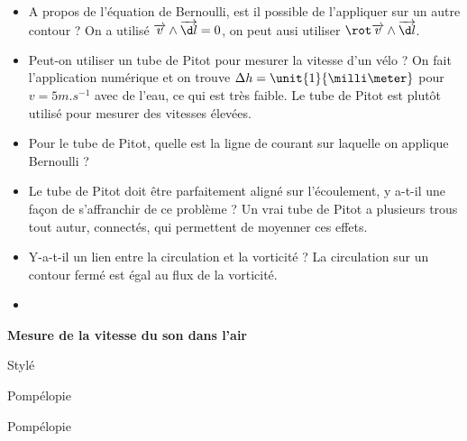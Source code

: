 \begin{itemize}
\item A propos de l'équation de Bernoulli, est il possible de l'appliquer sur un autre contour ?
On a utilisé $\overrightarrow{v}\wedge\overrightarrow{\d l} = 0$, on peut ausi utiliser $\rot\overrightarrow{v} \wedge \overrightarrow{\d l}$.
\item Peut-on utiliser un tube de Pitot pour mesurer la vitesse d'un vélo ?
On fait l'application numérique et on trouve $\Delta h = \unit{1}{\milli\meter}$ pour $v=\unit{5}{m.s^{-1}}$ avec de l'eau, ce qui est très faible.
Le tube de Pitot est plutôt utilisé pour mesurer des vitesses élevées.
\item Pour le tube de Pitot, quelle est la ligne de courant sur laquelle on applique Bernoulli ?
\item Le tube de Pitot doit être parfaitement aligné sur l'écoulement, y a-t-il une façon de s'affranchir de ce problème ?
Un vrai tube de Pitot a plusieurs trous tout autur, connectés, qui permettent de moyenner ces effets.
\item Y-a-t-il un lien entre la circulation et la vorticité ?
La circulation sur un contour fermé est égal au flux de la vorticité.
\item 
\end{itemize}


\begin{experience}
\textbf{Mesure de la vitesse du son dans l'air}
\end{experience}
\begin{slide}
Stylé
\end{slide}
\begin{transition}
Pompélopie
\end{transition}
\begin{remarque}
Pompélopie
\end{remarque}
